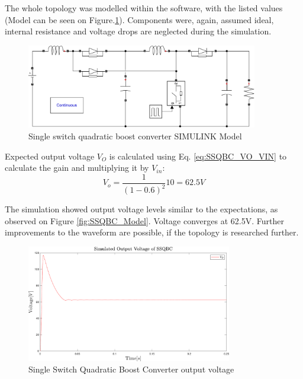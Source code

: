 The whole topology was modelled within the software, with the listed values (Model can be seen on Figure.\ref{fig:Model_SSQBC}). Components were, again, assumed ideal, internal resistance and voltage drops are neglected during the simulation. 

\begin{figure} [H]
   \centering
   \includegraphics[width=0.9\textwidth]{figures/cSingleSwitchQuadraticBC/Model_SSQBC.pdf}
    \caption{Single switch quadratic boost converter SIMULINK Model}
	\label{fig:Model_SSQBC}
\end{figure}

Expected output voltage $V_O$ is calculated using Eq. \ref{eq:SSQBC_VO_VIN} to calculate the gain and multiplying it by $V_{in}$: 
\begin{equation}
	{V_o}= \frac{1}{(1-0.6)^2}10=62.5V
	\label{eq:Simulation_SSQBC}
\end{equation}

The simulation showed output voltage levels similar to the expectations, as observed on Figure \ref{fig:SSQBC_Model}. Voltage converges at 62.5V. Further improvements to the waveform are possible, if the topology is researched further. 

\begin{figure} [H]
   \centering
   \includegraphics[width=0.8\textwidth]{figures/cSingleSwitchQuadraticBC/Simulation_SSQBC.pdf}
    \caption{Single Switch Quadratic Boost Converter output voltage}
	\label{fig:SSQBC_Result}
\end{figure}
\clearpage
